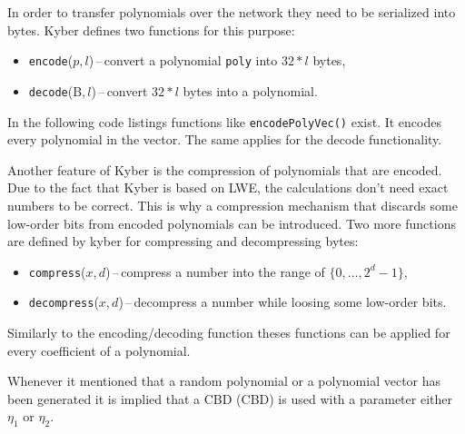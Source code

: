 In order to transfer polynomials over the network they need to be serialized into bytes. Kyber defines two functions for this purpose:
\begin{itemize}
  \item \texttt{encode}($p$,\,$l$)\,--\,convert a polynomial \texttt{poly} into $32*l$ bytes,
  \item \texttt{decode}(B,\,$l$)\,--\,convert $32*l$ bytes into a polynomial.
\end{itemize}
In the following code listings functions like \texttt{encodePolyVec()} exist. It encodes every polynomial in the vector. The same applies for the decode functionality.

Another feature of Kyber is the compression of polynomials that are encoded. Due to the fact that Kyber is based on LWE, the calculations don't need exact numbers to be correct. This is why a compression mechanism that discards some low-order bits from encoded polynomials can be introduced. Two more functions are defined by kyber for compressing and decompressing bytes:
\begin{itemize}
  \item \texttt{compress}($x$,\,$d$)\,--\,compress a number into the range of $\{0,\dots,2^d-1\}$,
  \item \texttt{decompress}($x$,\,$d$)\,--\,decompress a number while loosing some low-order bits.
\end{itemize}
Similarly to the encoding/decoding function theses functions can be applied for every coefficient of a polynomial.

Whenever it mentioned that a random polynomial or a polynomial vector has been generated it is implied that a CBD (\acl{CBD}) is used with a parameter either $\eta_1$ or $\eta_2$.
